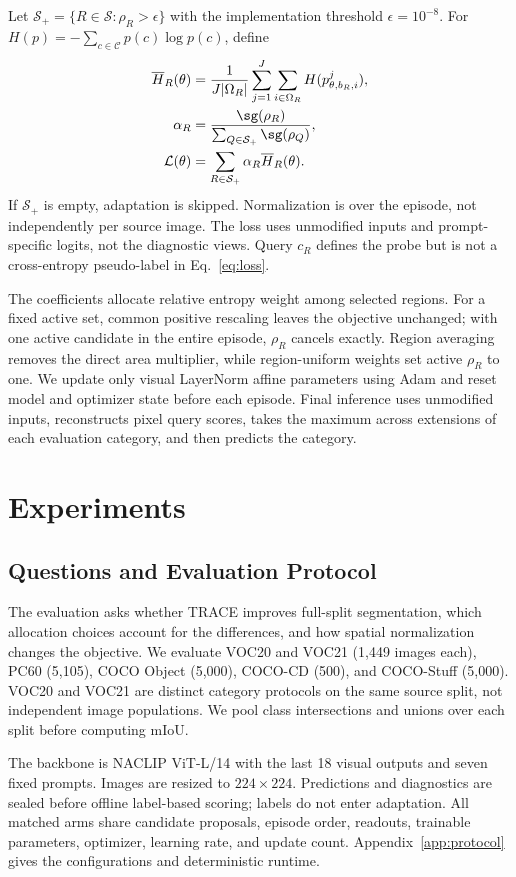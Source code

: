 \documentclass[letterpaper]{article}
\begin{document}
Let $\mathcal S_+=\{R\in\mathcal S:\rho_R>\epsilon\}$ with the implementation threshold $\epsilon=10^{-8}$. For $H(p)=-\sum_{c\in\mathcal C}p(c)\log p(c)$, define
\begin{align}
\overline H_R(\theta)&=\frac{1}{J|\Omega_R|}
\sum_{j=1}^J\sum_{i\in\Omega_R}H(p^j_{\theta,b_R,i}),\\
\alpha_R&=\frac{\sg(\rho_R)}{\sum_{Q\in\mathcal S_+}\sg(\rho_Q)},\\
\mathcal L(\theta)&=\sum_{R\in\mathcal S_+}\alpha_R\overline H_R(\theta).
\label{eq:loss}
\end{align}
If $\mathcal S_+$ is empty, adaptation is skipped. Normalization is over the episode, not independently per source image. The loss uses unmodified inputs and prompt-specific logits, not the diagnostic views. Query $c_R$ defines the probe but is not a cross-entropy pseudo-label in Eq.~\ref{eq:loss}.

The coefficients allocate relative entropy weight among selected regions. For a fixed active set, common positive rescaling leaves the objective unchanged; with one active candidate in the entire episode, $\rho_R$ cancels exactly. Region averaging removes the direct area multiplier, while region-uniform weights set active $\rho_R$ to one. We update only visual LayerNorm affine parameters using Adam and reset model and optimizer state before each episode. Final inference uses unmodified inputs, reconstructs pixel query scores, takes the maximum across extensions of each evaluation category, and then predicts the category.

\section{Experiments}
\subsection{Questions and Evaluation Protocol}
The evaluation asks whether TRACE improves full-split segmentation, which allocation choices account for the differences, and how spatial normalization changes the objective. We evaluate VOC20 and VOC21 (1,449 images each), PC60 (5,105), COCO Object (5,000), COCO-CD (500), and COCO-Stuff (5,000). VOC20 and VOC21 are distinct category protocols on the same source split, not independent image populations. We pool class intersections and unions over each split before computing mIoU.

The backbone is NACLIP ViT-L/14 with the last 18 visual outputs and seven fixed prompts. Images are resized to $224\times224$. Predictions and diagnostics are sealed before offline label-based scoring; labels do not enter adaptation. All matched arms share candidate proposals, episode order, readouts, trainable parameters, optimizer, learning rate, and update count. Appendix~\ref{app:protocol} gives the configurations and deterministic runtime.
\end{document}
